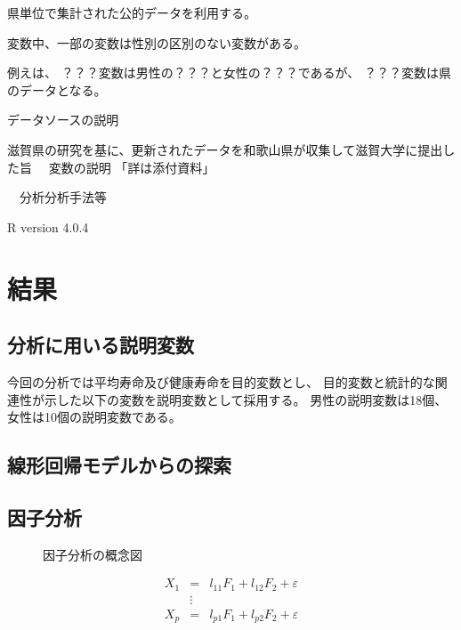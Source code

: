 \documentclass[a4j,11pt,mc, twocolumn]{jreport}
\begin{document}
県単位で集計された公的データを利用する。

変数中、一部の変数は性別の区別のない変数がある。

例えは、
？？？変数は男性の？？？と女性の？？？であるが、
？？？変数は県のデータとなる。



データソースの説明


滋賀県の研究を基に、更新されたデータを和歌山県が収集して滋賀大学に提出した旨
　変数の説明
「詳は添付資料」

　分析分析手法等

R version 4.0.4



\chapter{結果}






	\section{分析に用いる説明変数}

今回の分析では平均寿命及び健康寿命を目的変数とし、
目的変数と統計的な関連性が示した以下の変数を説明変数として採用する。
男性の説明変数は18個、女性は10個の説明変数である。







	\section{線形回帰モデルからの探索}




	\section{因子分析}

\begin{figure}
	\caption{因子分析の概念図}
	\label{FAdiagram}
\end{figure}


	\begin{eqnarray}
	X_1 &=&l_{11}F_1+l_{12}F_2+\varepsilon\\
	&\vdots&\\\nonumber
	X_p &=&l_{p1}F_1+l_{p2}F_2+\varepsilon
	\end{eqnarray}
\end{document}
